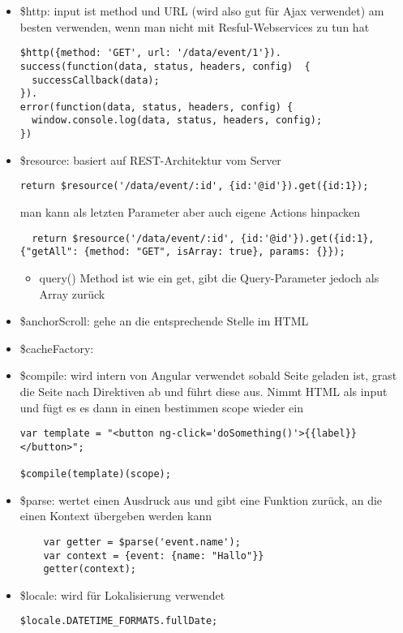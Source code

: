 \begin{itemize}
  \item \$http: input ist method und URL (wird also gut für Ajax verwendet) am besten verwenden,
    wenn man nicht mit Resful-Webservices zu tun hat
    \begin{verbatim}
$http({method: 'GET', url: '/data/event/1'}).
success(function(data, status, headers, config)  {
  successCallback(data);
}).
error(function(data, status, headers, config) {
  window.console.log(data, status, headers, config);
})
    \end{verbatim}
  \item \$resource: basiert auf REST-Architektur vom Server
  \begin{verbatim}
return $resource('/data/event/:id', {id:'@id'}).get({id:1});
  \end{verbatim}
    man kann als letzten Parameter aber auch eigene Actions hinpacken
  \begin{verbatim}
  return $resource('/data/event/:id', {id:'@id'}).get({id:1}, {"getAll": {method: "GET", isArray: true}, params: {}});
  \end{verbatim}

  \begin{itemize}
    \item query() Method ist wie ein get, gibt die Query-Parameter jedoch als Array zurück
  \end{itemize}
  \item \$anchorScroll: gehe an die entsprechende Stelle im HTML
  \item \$cacheFactory:
  \item \$compile: wird intern von Angular verwendet sobald Seite geladen ist, grast die Seite nach Direktiven ab und
    führt diese aus. Nimmt HTML als input und fügt es es dann in einen bestimmen scope wieder ein
    \begin{verbatim}
var template = "<button ng-click='doSomething()'>{{label}}</button>";

$compile(template)(scope);
    \end{verbatim}
  \item \$parse: wertet einen Ausdruck aus und gibt eine Funktion zurück, an die einen Kontext
    übergeben werden kann
    \begin{verbatim}
    var getter = $parse('event.name');
    var context = {event: {name: "Hallo"}}
    getter(context);
    \end{verbatim}
  \item \$locale: wird für Lokalisierung verwendet
    \begin{verbatim}
$locale.DATETIME_FORMATS.fullDate;
    \end{verbatim}


\end{itemize}
